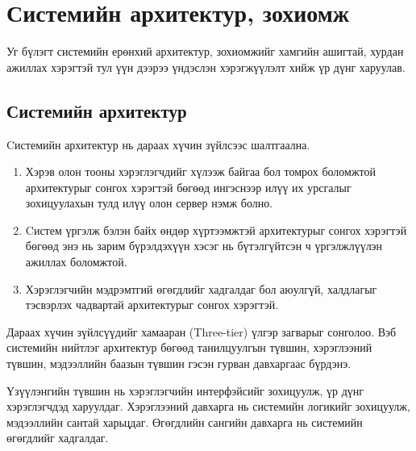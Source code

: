 \chapter{Системийн архитектур, зохиомж}

Уг бүлэгт системийн ерөнхий архитектур, зохиомжийг хамгийн ашигтай, хурдан ажиллах хэрэгтэй тул үүн дээрээ үндэслэн хэрэгжүүлэлт хийж үр дүнг харуулав.

\section{Системийн архитектур}

Cистемийн архитектур нь дараах хүчин зүйлсээс шалтгаална.

\begin{enumerate}
	\item Хэрэв олон тооны хэрэглэгчдийг хүлээж байгаа бол томрох боломжтой архитектурыг сонгох хэрэгтэй бөгөөд ингэснээр илүү их урсгалыг зохицуулахын тулд илүү олон сервер нэмж болно.
	\item Cистем үргэлж бэлэн байх өндөр хүртээмжтэй архитектурыг сонгох хэрэгтэй бөгөөд энэ нь зарим бүрэлдэхүүн хэсэг нь бүтэлгүйтсэн ч үргэлжлүүлэн ажиллах боломжтой.
	\item Хэрэглэгчийн мэдрэмтгий өгөгдлийг хадгалдаг бол аюулгүй, халдлагыг тэсвэрлэх чадвартай архитектурыг сонгох хэрэгтэй.
\end{enumerate}

Дараах хүчин зүйлсүүдийг хамааран (Three-tier) үлгэр загварыг сонголоо. Вэб системийн нийтлэг архитектур бөгөөд танилцуулгын түвшин, хэрэглээний түвшин, мэдээллийн баазын түвшин гэсэн гурван давхаргаас бүрдэнэ.

\clearpage
Үзүүлэнгийн түвшин нь хэрэглэгчийн интерфэйсийг зохицуулж, үр дүнг хэрэглэгчдэд харуулдаг. Хэрэглээний давхарга нь системийн логикийг зохицуулж, мэдээллийн сантай харьцдаг. Өгөгдлийн сангийн давхарга нь системийн өгөгдлийг хадгалдаг.

